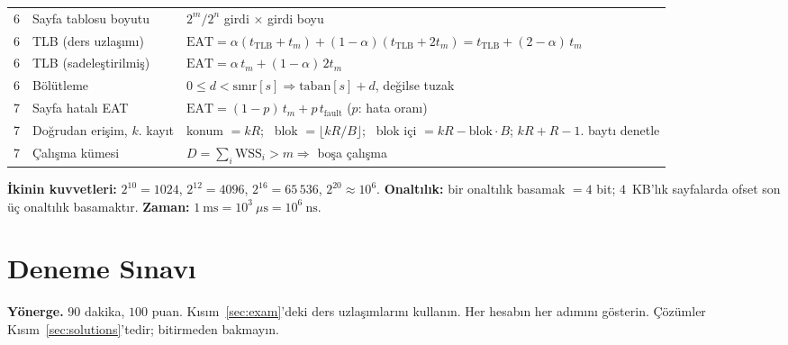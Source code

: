 \documentclass[11pt,a4paper]{article}
\begin{document}
\begin{center}
\begin{tabularx}{\linewidth}{@{}c >{\raggedright\arraybackslash}p{4.3cm} >{\raggedright\arraybackslash}X@{}}
6 & Sayfa tablosu boyutu & $2^{m}/2^{n}$ girdi $\times$ girdi boyu \\
6 & TLB (ders uzlaşımı) & $\text{EAT} = \alpha(t_{\text{TLB}} + t_m) + (1-\alpha)(t_{\text{TLB}} + 2t_m) = t_{\text{TLB}} + (2-\alpha)\,t_m$ \\
6 & TLB (sadeleştirilmiş) & $\text{EAT} = \alpha\,t_m + (1-\alpha)\,2t_m$ \\
6 & Bölütleme & $0 \le d < \text{sınır}[s] \Rightarrow \text{taban}[s] + d$, değilse tuzak \\
7 & Sayfa hatalı EAT & $\text{EAT} = (1-p)\,t_m + p\,t_{\text{fault}}$ \quad ($p$: hata oranı) \\
7 & Doğrudan erişim, $k$. kayıt & konum $= kR$; \ blok $= \lfloor kR/B \rfloor$; \ blok içi $= kR - \text{blok}\cdot B$; $kR + R - 1$. baytı denetle \\
7 & Çalışma kümesi & $D = \sum_i \text{WSS}_i > m \Rightarrow$ boşa çalışma \\
\bottomrule
\end{tabularx}
\end{center}
\textbf{İkinin kuvvetleri:} $2^{10} = 1024$, $2^{12} = 4096$, $2^{16} = 65\,536$, $2^{20} \approx 10^{6}$. \textbf{Onaltılık:} bir onaltılık basamak $= 4$ bit; $4$~KB'lık sayfalarda ofset son üç onaltılık basamaktır. \textbf{Zaman:} $1\ \text{ms} = 10^{3}\ \mu\text{s} = 10^{6}\ \text{ns}$.
\newpage

\section{Deneme Sınavı}
\label{sec:practice}
\textbf{Yönerge.} $90$ dakika, $100$ puan. Kısım~\ref{sec:exam}'deki ders uzlaşımlarını kullanın. Her hesabın her adımını gösterin. Çözümler Kısım~\ref{sec:solutions}'tedir; bitirmeden bakmayın.
\end{document}
